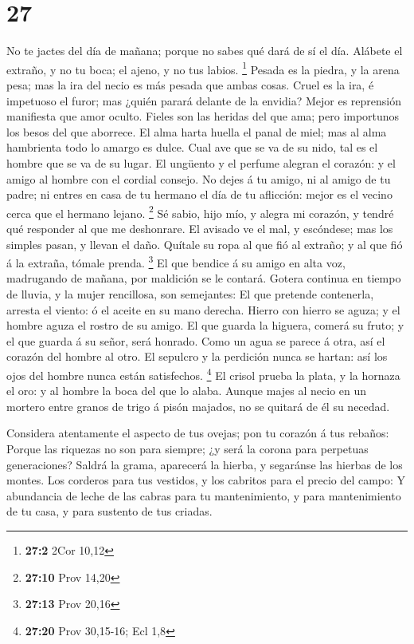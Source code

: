 \hypertarget{section-26}{%
\section{27}\label{section-26}}

 No te jactes del día de mañana; porque no sabes qué dará de
sí el día.  Alábete el extraño, y no tu boca; el ajeno, y no
tus labios. \footnote{\textbf{27:2} 2Cor 10,12}  Pesada es
la piedra, y la arena pesa; mas la ira del necio es más pesada que ambas
cosas.  Cruel es la ira, é impetuoso el furor; mas ¿quién
parará delante de la envidia?  Mejor es reprensión
manifiesta que amor oculto.  Fieles son las heridas del que
ama; pero importunos los besos del que aborrece.  El alma
harta huella el panal de miel; mas al alma hambrienta todo lo amargo es
dulce.  Cual ave que se va de su nido, tal es el hombre que
se va de su lugar.  El ungüento y el perfume alegran el
corazón: y el amigo al hombre con el cordial consejo.  No
dejes á tu amigo, ni al amigo de tu padre; ni entres en casa de tu
hermano el día de tu aflicción: mejor es el vecino cerca que el hermano
lejano. \footnote{\textbf{27:10} Prov 14,20}  Sé sabio,
hijo mío, y alegra mi corazón, y tendré qué responder al que me
deshonrare.  El avisado ve el mal, y escóndese; mas los
simples pasan, y llevan el daño.  Quítale su ropa al que
fió al extraño; y al que fió á la extraña, tómale prenda. \footnote{\textbf{27:13}
  Prov 20,16}  El que bendice á su amigo en alta voz,
madrugando de mañana, por maldición se le contará.  Gotera
continua en tiempo de lluvia, y la mujer rencillosa, son semejantes:
 El que pretende contenerla, arresta el viento: ó el aceite
en su mano derecha.  Hierro con hierro se aguza; y el
hombre aguza el rostro de su amigo.  El que guarda la
higuera, comerá su fruto; y el que guarda á su señor, será honrado.
 Como un agua se parece á otra, así el corazón del hombre
al otro.  El sepulcro y la perdición nunca se hartan: así
los ojos del hombre nunca están satisfechos. \footnote{\textbf{27:20}
  Prov 30,15-16; Ecl 1,8}  El crisol prueba la plata, y la
hornaza el oro: y al hombre la boca del que lo alaba. 
Aunque majes al necio en un mortero entre granos de trigo á pisón
majados, no se quitará de él su necedad.

 Considera atentamente el aspecto de tus ovejas; pon tu
corazón á tus rebaños:  Porque las riquezas no son para
siempre; ¿y será la corona para perpetuas generaciones? 
Saldrá la grama, aparecerá la hierba, y segaránse las hierbas de los
montes.  Los corderos para tus vestidos, y los cabritos
para el precio del campo:  Y abundancia de leche de las
cabras para tu mantenimiento, y para mantenimiento de tu casa, y para
sustento de tus criadas.

